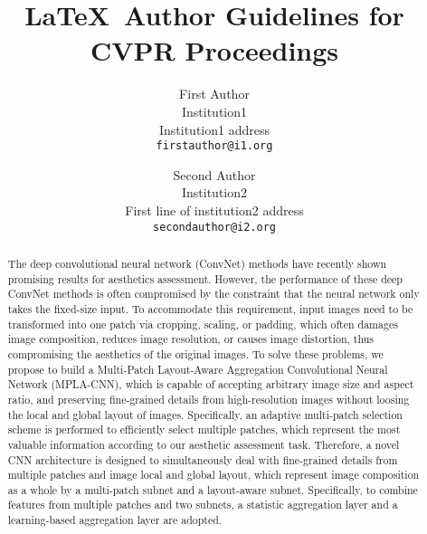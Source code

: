 \documentclass[10pt,twocolumn,letterpaper]{article}
\begin{document}
\title{\LaTeX\ Author Guidelines for CVPR Proceedings}

\author{First Author\\
Institution1\\
Institution1 address\\
{\tt\small firstauthor@i1.org}
\and
Second Author\\
Institution2\\
First line of institution2 address\\
{\tt\small secondauthor@i2.org}
}

\maketitle
\begin{abstract}	
The deep convolutional neural network (ConvNet) methods 
have recently shown promising results for aesthetics assessment. However, the performance of these deep ConvNet 
methods is often compromised by the constraint that the neural network only takes the fixed-size input. 
To accommodate this requirement, input images need to be transformed into one patch via cropping, scaling, or padding, 
which often damages image composition, reduces image resolution, or causes image distortion, thus compromising the aesthetics of the original images.
To solve these problems, we propose to build a Multi-Patch Layout-Aware Aggregation Convolutional Neural Network (MPLA-CNN),
which is capable of accepting arbitrary image size and aspect ratio, and preserving fine-grained 
details from high-resolution images without loosing the local and global layout of images.
Specifically, an adaptive multi-patch selection scheme is performed to efficiently select multiple patches, which
represent the most valuable information according to our aesthetic assessment task. Therefore, a novel CNN architecture
is designed to simultaneously deal with fine-grained details from multiple patches and image local and global layout, which 
represent image composition as a whole by a multi-patch subnet and a layout-aware subnet.
Specifically, to combine features from multiple patches and two subnets, a statistic aggregation layer and 
a learning-based aggregation layer are adopted.

\end{abstract}
\end{document}
